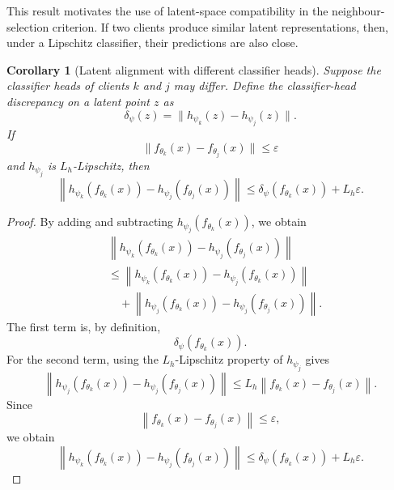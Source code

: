 \documentclass[conference]{IEEEtran}
\newtheorem{corollary}{Corollary}
\begin{document}
This result motivates the use of latent-space compatibility in the neighbour-selection criterion. If two clients produce similar latent representations, then, under a Lipschitz classifier, their predictions are also close.

\begin{corollary}[Latent alignment with different classifier heads]
\label{cor:different_heads}
Suppose the classifier heads of clients $k$ and $j$ may differ. Define the classifier-head discrepancy on a latent point $z$ as
\begin{equation}
\delta_{\psi}(z)
=
\|h_{\psi_k}(z)-h_{\psi_j}(z)\|.
    \label{eq:auto-083}
\end{equation}
If
\begin{equation}
\|f_{\theta_k}(x)-f_{\theta_j}(x)\|
\leq
\varepsilon
    \label{eq:auto-084}
\end{equation}
and $h_{\psi_j}$ is $L_h$-Lipschitz, then
\begin{equation}
\left\|
h_{\psi_k}(f_{\theta_k}(x))
-
h_{\psi_j}(f_{\theta_j}(x))
\right\|
\leq
\delta_{\psi}(f_{\theta_k}(x))
+
L_h\varepsilon.
    \label{eq:auto-085}
\end{equation}
\end{corollary}

\begin{proof}
By adding and subtracting $h_{\psi_j}(f_{\theta_k}(x))$, we obtain
\begin{align}
&\left\|
 h_{\psi_k}(f_{\theta_k}(x))
 -h_{\psi_j}(f_{\theta_j}(x))
\right\| \\
&\leq
\left\|
 h_{\psi_k}(f_{\theta_k}(x))
 -h_{\psi_j}(f_{\theta_k}(x))
\right\| \\
&\quad+
\left\|
 h_{\psi_j}(f_{\theta_k}(x))
 -h_{\psi_j}(f_{\theta_j}(x))
\right\|.
\end{align}
The first term is, by definition,
\begin{equation}
\delta_{\psi}(f_{\theta_k}(x)).
    \label{eq:auto-086}
\end{equation}
For the second term, using the $L_h$-Lipschitz property of $h_{\psi_j}$ gives
\begin{equation}
\left\|
h_{\psi_j}(f_{\theta_k}(x))
-
h_{\psi_j}(f_{\theta_j}(x))
\right\|
\leq
L_h
\left\|
f_{\theta_k}(x)-f_{\theta_j}(x)
\right\|.
    \label{eq:auto-087}
\end{equation}
Since
\begin{equation}
\left\|
f_{\theta_k}(x)-f_{\theta_j}(x)
\right\|
\leq
\varepsilon,
    \label{eq:auto-088}
\end{equation}
we obtain
\begin{equation}
\left\|
h_{\psi_k}(f_{\theta_k}(x))
-
h_{\psi_j}(f_{\theta_j}(x))
\right\|
\leq
\delta_{\psi}(f_{\theta_k}(x))
+
L_h\varepsilon.
    \label{eq:auto-089}
\end{equation}
\end{proof}
\end{document}
